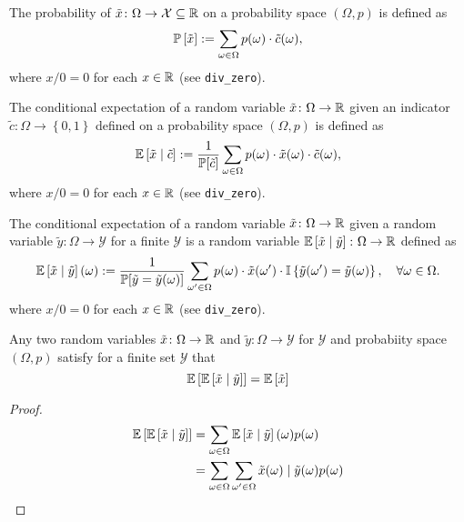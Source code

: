 \begin{definition}[Probability]
  The probability of $\tilde{x}\colon \Omega \to \mathcal{X} \subseteq \Real$ on a probability space $(\Omega, p)$ is defined as
  \[
    \P \left[ \tilde{x} \right] := \sum_{\omega \in \Omega } p(\omega) \cdot \tilde{c}(\omega),
  \]
where $x / 0 = 0$ for each $x\in \Real$ (see \texttt{div\_zero}).
\end{definition}


\begin{definition}
  The conditional expectation of a random variable $\tilde{x} \colon \Omega \to \Real$ given an indicator $\tilde{c} \colon \Omega \to  \left\{ 0, 1  \right\}$ defined on a probability space $(\Omega, p)$ is defined as
  \[
    \E \left[ \tilde{x} \mid  \tilde{c} \right] := \frac{1}{\P[\tilde{c}]} \sum_{\omega \in \Omega } p(\omega ) \cdot \tilde{x}(\omega) \cdot \tilde{c}(\omega),
  \]
where $x / 0 = 0$ for each $x\in \Real$ (see \texttt{div\_zero}).
  \leanok
\end{definition}

\begin{definition}
  The conditional expectation of a random variable $\tilde{x} \colon \Omega \to \Real$ given a random variable $\tilde{y} \colon \Omega \to \mathcal{Y}$ for a finite $\mathcal{Y}$ is a random variable $\E \left[ \tilde{x} \mid  \tilde{y} \right]\colon \Omega \to \Real$  defined as
  \[
    \E \left[ \tilde{x} \mid  \tilde{y} \right](\omega)
    :=
    \frac{1}{\P[\tilde{y} = \tilde{y}(\omega)]} \sum_{\omega' \in \Omega } p(\omega) \cdot \tilde{x}(\omega') \cdot \mathbb{I}\left\{ \tilde{y}(\omega') = \tilde{y}(\omega) \right\}, \quad \forall \omega \in \Omega.
  \]
where $x / 0 = 0$ for each $x\in \Real$ (see \texttt{div\_zero}).
  \leanok
\end{definition}





\begin{theorem}
Any two random variables $\tilde{x} \colon \Omega \to \Real$ and $\tilde{y} \colon \Omega \to \mathcal{Y} $ for $\mathcal{Y}$ and probabiity space $(\Omega, p)$ satisfy for a finite set $\mathcal{Y}$ that
  \[
   \E\left[\E\left[\tilde{x} \mid  \tilde{y}\right]\right] = \E \left[ \tilde{x} \right] 
 \]
\end{theorem}
\begin{proof}
  \begin{align*}
    \E\left[\E\left[\tilde{x} \mid  \tilde{y}\right]\right]
    &= \sum_{\omega \in \Omega } \E\left[\tilde{x} \mid  \tilde{y}\right](\omega) p(\omega)  \\
    &= \sum_{\omega \in \Omega } \sum_{\omega'\in \Omega} \tilde{x}(\omega) \mid  \tilde{y}(\omega) p(\omega)  \\
  \end{align*}
\end{proof}



